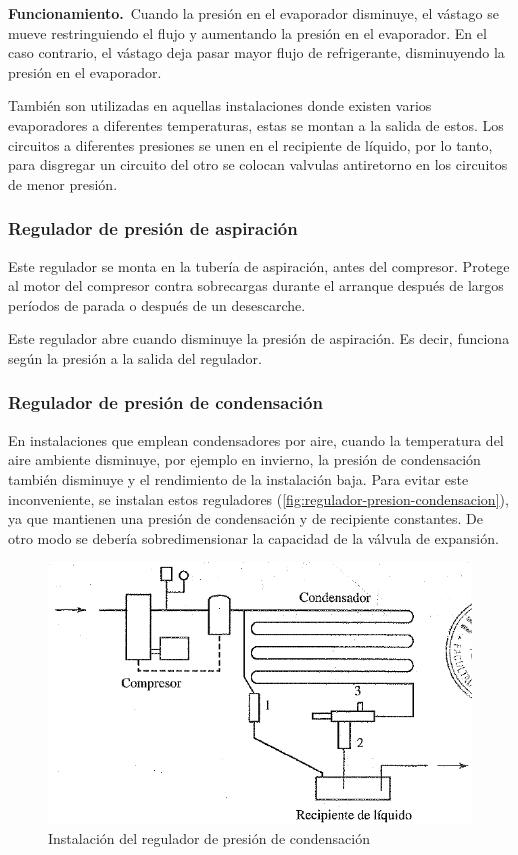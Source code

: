 \textbf{Funcionamiento.}\ Cuando la presi\'on en el evaporador disminuye, el v\'astago se mueve restringuiendo el flujo y aumentando la presi\'on en el evaporador. En el caso contrario, el v\'astago deja pasar mayor flujo de refrigerante, disminuyendo la presi\'on en el evaporador.

Tambi\'en son utilizadas en aquellas instalaciones donde existen varios evaporadores a diferentes temperaturas, estas se montan a la salida de estos. Los circuitos a diferentes presiones se unen en el recipiente de l\'iquido, por lo tanto, para disgregar un circuito del otro se colocan valvulas antiretorno en los circuitos de menor presi\'on.

\subsubsection{Regulador de presi\'on de aspiraci\'on}

Este regulador se monta en la tuber\'ia de aspiraci\'on, antes del compresor. Protege al motor del compresor contra sobrecargas durante el arranque despu\'es de largos per\'iodos de parada o despu\'es de un desescarche.

Este regulador abre cuando disminuye la presi\'on de aspiraci\'on. Es decir, funciona seg\'un la presi\'on a la salida del regulador.

\subsubsection{Regulador de presi\'on de condensaci\'on}

En instalaciones que emplean condensadores por aire, cuando la temperatura del aire ambiente disminuye, por ejemplo en invierno, la presi\'on de condensaci\'on tambi\'en disminuye y el rendimiento de la instalaci\'on baja. Para evitar este inconveniente, se instalan estos reguladores (\autoref{fig:regulador-presion-condensacion}), ya que mantienen una presi\'on de condensaci\'on y de recipiente constantes. De otro modo se deber\'ia sobredimensionar la capacidad de la v\'alvula de expansi\'on.

\begin{figure}[H]
    \centering
    \includegraphics[width=.6\linewidth]{figuras/dispositivos-de-expansion/regulador-presion-condensacion.png}
    \caption{Instalaci\'on del regulador de presi\'on de condensaci\'on}
    \label{fig:regulador-presion-condensacion}
\end{figure}

